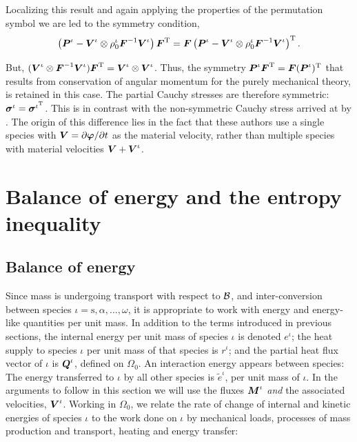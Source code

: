 \noindent Localizing this result and again applying the properties
of the permutation symbol we are led to the symmetry condition,
\begin{equation}
\left(\mbox{\boldmath$ P$}^\iota-\mbox{\boldmath$ V$}^\iota\otimes\rho^\iota_0\mbox{\boldmath$ F$}^{-1}\mbox{\boldmath$ V$}^\iota\right)\mbox{\boldmath$ F$}^\mathrm{T}
=
\mbox{\boldmath$ F$}\left(\mbox{\boldmath$ P$}^\iota-\mbox{\boldmath$ V$}^\iota\otimes\rho^\iota_0\mbox{\boldmath$ F$}^{-1}\mbox{\boldmath$ V$}^\iota\right)^\mathrm{T}.
\end{equation}

\noindent But, $(\mbox{\boldmath$ V$}^\iota\otimes\mbox{\boldmath$ F$}^{-1}\mbox{\boldmath$ V$}^\iota)\mbox{\boldmath$ F$}^\mathrm{T}
= \mbox{\boldmath$ V$}^\iota\otimes\mbox{\boldmath$ V$}^\iota$. Thus, the symmetry
$\mbox{\boldmath$ P$}^\iota\mbox{\boldmath$ F$}^\mathrm{T} = \mbox{\boldmath$ F$}(\mbox{\boldmath$ P$}^\iota)^\mathrm{T}$ that results
from conservation of angular momentum for the purely mechanical
theory, is retained in this case. The partial Cauchy stresses are
therefore symmetric: $\mbox{\boldmath$\sigma$}^\iota = \mbox{\boldmath$\sigma$}^{\iota^\mathrm{T}}$.
This is in contrast with the non-symmetric Cauchy stress arrived
at by \citet{EpsteinMaugin:2000}. The origin of this difference
lies in the fact that these authors use a single species with $\mbox{\boldmath$ V$}
=
\partial\mbox{\boldmath$\varphi$}/\partial t$ as the material velocity, rather than
multiple species with material velocities $\mbox{\boldmath$ V$} + \mbox{\boldmath$ V$}^\iota$.

\section{Balance of energy and the entropy inequality}
\label{sect4}

\subsection{Balance of energy}\label{sect4.1}
Since mass is undergoing transport with respect to ${\mathcal B}$, and
inter-conversion between species $\iota =
\mathrm{s},\alpha,\dots,\omega$, it is appropriate to work with
energy and energy-like quantities per unit mass. In addition to
the terms introduced in previous sections, the internal energy per
unit mass of species $\iota$ is denoted $e^\iota$; the heat supply
to species $\iota$ per unit mass of that species is $r^\iota$; and
the partial heat flux vector of $\iota$ is $\mbox{\boldmath$ Q$}^\iota$, defined on
$\Omega_0$. An interaction energy appears between species: The
energy transferred to $\iota$ by all other species is
$\tilde{e}^\iota$, per unit mass of $\iota$. In the arguments to
follow in this section we will use the fluxes $\mbox{\boldmath$ M$}^\iota$
\emph{and} the associated velocities, $\mbox{\boldmath$ V$}^\iota$. Working in
$\Omega_0$, we relate the rate of change of internal and kinetic
energies of species $\iota$ to the work done on $\iota$ by
mechanical loads, processes of mass production and transport,
heating and energy transfer:


